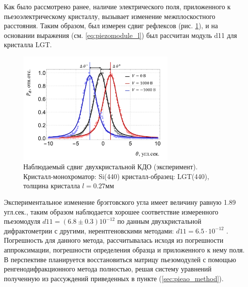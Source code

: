 Как было рассмотрено ранее, наличие электрического поля, приложенного
к пьезоэлектрическому кристаллу, вызывает изменение межплоскостного расстояния.
Таким образом, был измерен сдвиг рефлексов (рис. \ref{ris:d11_experiment}), и на основании выражения
 (см. \ref{eq:piezomodule_l}) был рассчитан модуль d11 для кристалла LGT.

\begin{figure}[H]
  \centering
  \includegraphics[width=0.7\textwidth]{images/peak_shift_1000v.png}
  \caption{Наблюдаемый сдвиг двухкристальной КДО (эксперимент). Кристалл-монохроматор: Si(440)
  кристалл-образец: LGT(440), толщина кристалла $l = 0.27мм$ }
  \label{ris:d11_experiment}
\end{figure}

Экспериментальное изменение брэгговского угла имеет величину равную 1.89 угл.сек., таким образом
наблюдается хорошее соответствие измеренного пьезомодуля $d11 = (6.8 \pm 0.3 ) 10^{-12}$ по данным
двухкристальной дифрактометрии с другими, нерентгеновскими методами: $d11 = 6.5 \cdot 10^{-12}$ \cite{LGT_piezo_d11}.
Погрешность для данного метода, рассчитывалась исходя из погрешности
аппроксимации, погрешности определения образца и приложенного к нему поля.
В перспективе планируется восстановиться матрицу пьезомодулей с помощью
ренгенодифракционного метода полностью, решая систему уравнений полученную из рассуждений
приведенных в пункте (\ref{sec:pieao_method}).
